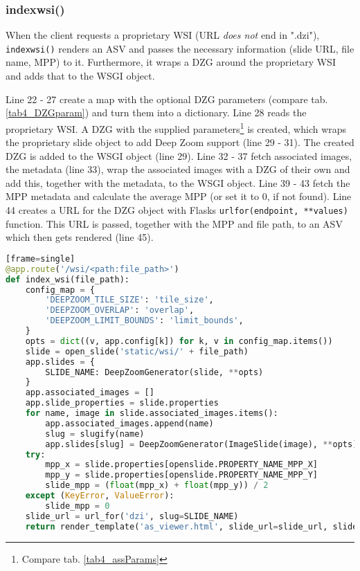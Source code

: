 \subsubsection{index{\textunderscore}wsi()}
When the client requests a proprietary WSI (URL \emph{does not} end in ".dzi"), \texttt{index{\textunderscore}wsi()} renders an ASV and passes the necessary information (slide URL, file name, MPP) to it. Furthermore, it wraps a DZG around the proprietary WSI and adds that to the WSGI object.

Line 22 - 27 create a map with the optional DZG parameters (compare tab. \ref{tab4_DZGparam}) and turn them into a dictionary. Line 28 reads the proprietary WSI. A DZG with the supplied parameters\footnote{Compare tab. \ref{tab4_assParams}} is created, which wraps the proprietary slide object to add Deep Zoom support (line 29 - 31). The created DZG is added to the WSGI object (line 29). Line 32 - 37 fetch associated images, the metadata (line 33), wrap the associated images with a DZG of their own and add this, together with the metadata, to the WSGI object. Line 39 - 43 fetch the MPP metadata and calculate the average MPP (or set it to 0, if not found). 
Line 44 creates a URL for the DZG object with Flasks \texttt{url{\textunderscore}for(endpoint, **values)} function. This URL is passed, together with the MPP and file path, to an ASV which then gets rendered (line 45).

\begin{lstlisting}[language=Python][frame=single]
@app.route('/wsi/<path:file_path>')
def index_wsi(file_path):
	config_map = {
		'DEEPZOOM_TILE_SIZE': 'tile_size',
		'DEEPZOOM_OVERLAP': 'overlap',
		'DEEPZOOM_LIMIT_BOUNDS': 'limit_bounds',
	}
	opts = dict((v, app.config[k]) for k, v in config_map.items())
	slide = open_slide('static/wsi/' + file_path)
	app.slides = {
		SLIDE_NAME: DeepZoomGenerator(slide, **opts)
	}
	app.associated_images = []
	app.slide_properties = slide.properties
	for name, image in slide.associated_images.items():
		app.associated_images.append(name)
		slug = slugify(name)
		app.slides[slug] = DeepZoomGenerator(ImageSlide(image), **opts)
	try:
		mpp_x = slide.properties[openslide.PROPERTY_NAME_MPP_X]
		mpp_y = slide.properties[openslide.PROPERTY_NAME_MPP_Y]
		slide_mpp = (float(mpp_x) + float(mpp_y)) / 2
	except (KeyError, ValueError):
		slide_mpp = 0
	slide_url = url_for('dzi', slug=SLIDE_NAME)
	return render_template('as_viewer.html', slide_url=slide_url, slide_mpp=slide_mpp, file_name=file_path)
\end{lstlisting}


